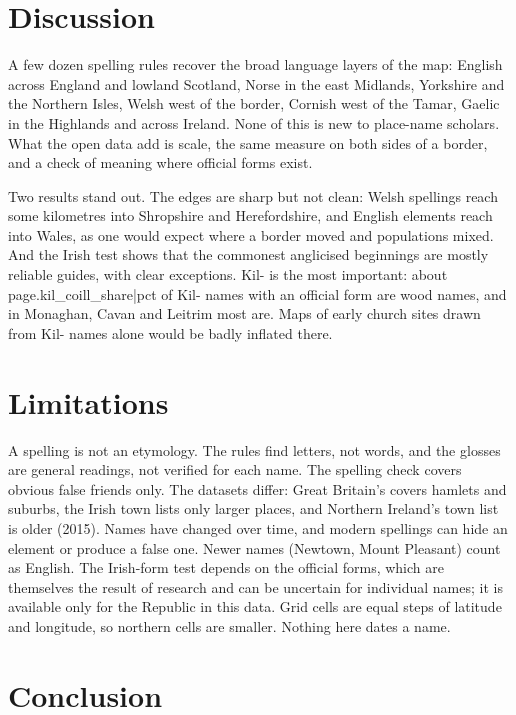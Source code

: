 \documentclass[11pt,a4paper]{article}
\begin{document}
\section{Discussion}

A few dozen spelling rules recover the broad language layers of the map: English across England and lowland Scotland, Norse in the east Midlands, Yorkshire and the Northern Isles, Welsh west of the border, Cornish west of the Tamar, Gaelic in the Highlands and across Ireland. None of this is new to place-name scholars. What the open data add is scale, the same measure on both sides of a border, and a check of meaning where official forms exist.

Two results stand out. The edges are sharp but not clean: Welsh spellings reach some kilometres into Shropshire and Herefordshire, and English elements reach into Wales, as one would expect where a border moved and populations mixed. And the Irish test shows that the commonest anglicised beginnings are mostly reliable guides, with clear exceptions. Kil- is the most important: about {{page.kil_coill_share|pct}} of Kil- names with an official form are wood names, and in Monaghan, Cavan and Leitrim most are. Maps of early church sites drawn from Kil- names alone would be badly inflated there.

\section{Limitations}

A spelling is not an etymology. The rules find letters, not words, and the glosses are general readings, not verified for each name. The spelling check covers obvious false friends only. The datasets differ: Great Britain's covers hamlets and suburbs, the Irish town lists only larger places, and Northern Ireland's town list is older (2015). Names have changed over time, and modern spellings can hide an element or produce a false one. Newer names (Newtown, Mount Pleasant) count as English. The Irish-form test depends on the official forms, which are themselves the result of research and can be uncertain for individual names; it is available only for the Republic in this data. Grid cells are equal steps of latitude and longitude, so northern cells are smaller. Nothing here dates a name.

\section{Conclusion}
\end{document}
